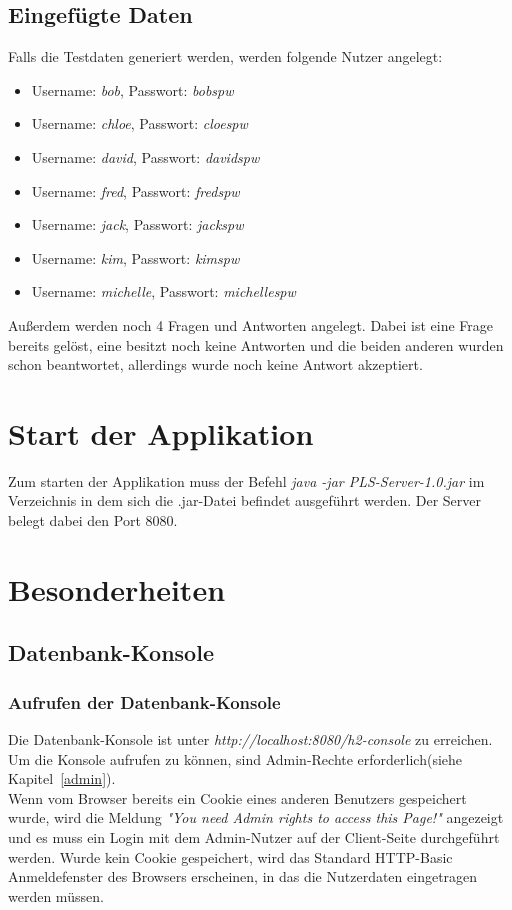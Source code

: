 \documentclass[a4paper]{report}
\begin{document}
\section{Eingefügte Daten}
Falls die Testdaten generiert werden, werden folgende Nutzer angelegt:
\begin{itemize}
	\item Username: \textit{bob}, Passwort: \textit{bobspw}
	\item Username: \textit{chloe}, Passwort: \textit{cloespw}
	\item Username: \textit{david}, Passwort: \textit{davidspw}
	\item Username: \textit{fred}, Passwort: \textit{fredspw}
	\item Username: \textit{jack}, Passwort: \textit{jackspw}
	\item Username: \textit{kim}, Passwort: \textit{kimspw}
	\item Username: \textit{michelle}, Passwort: \textit{michellespw}
\end{itemize}
Außerdem werden noch 4 Fragen und Antworten angelegt. Dabei ist eine Frage bereits gelöst, eine besitzt noch keine Antworten und die beiden anderen wurden schon beantwortet, allerdings wurde noch keine Antwort akzeptiert.
\chapter{Start der Applikation}
Zum starten der Applikation muss der Befehl \textit{java -jar PLS-Server-1.0.jar} im Verzeichnis in dem sich die .jar-Datei befindet ausgeführt werden. Der Server belegt dabei den Port 8080.
\chapter{Besonderheiten}
\section{Datenbank-Konsole}
\subsection{Aufrufen der Datenbank-Konsole}
Die Datenbank-Konsole ist unter \textit{http://localhost:8080/h2-console} zu erreichen. Um die Konsole aufrufen zu können, sind Admin-Rechte erforderlich(siehe Kapitel~\ref{admin}).\\ 
Wenn vom Browser bereits ein Cookie eines anderen Benutzers gespeichert wurde, wird die Meldung \textit{"You need Admin rights to access this Page!"} angezeigt und es muss ein Login mit dem Admin-Nutzer auf der Client-Seite durchgeführt werden. Wurde kein Cookie gespeichert, wird das Standard HTTP-Basic Anmeldefenster des Browsers erscheinen, in das die Nutzerdaten eingetragen werden müssen.
\end{document}
